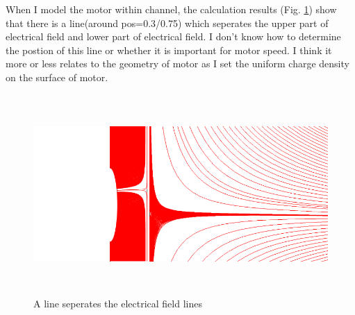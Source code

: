 \documentclass[fontsize=11pt, %
                             paper=a4, %
                             twoside, %
                             captions=tableheading,
                             index=totoc,
                             hyperref]{labbook}
\begin{document}
\begin{addmargin}[4cm]{0cm}
When I model the motor within channel, the calculation results (Fig. \ref{ALSTEFL-10-26-2016}) show that there is a line(around pos=0.3/0.75) which seperates the upper part of electrical field and lower part of electrical field. I don't know how to determine the postion of this line or whether it is important for motor speed. I think it more or less relates to the geometry of motor as I set the uniform charge density on the surface of motor.
\begin{figure}
\centering
\includegraphics[width=\linewidth, height=3in]{2016-10-30-line.png}
\caption{A line seperates the electrical field lines}\label{ALSTEFL-10-26-2016}
\end{figure}


\end{addmargin}
\end{document}
